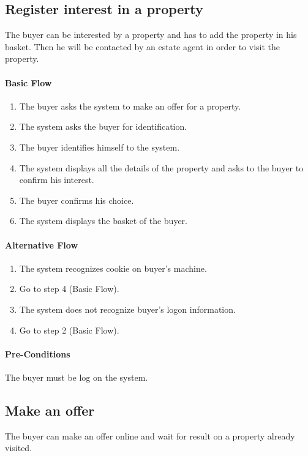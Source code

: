 \documentclass[a4paper,12pt]{article}
\begin{document}
\subsection{Register interest in a property}
The buyer can be interested by a property and has to add the property in his basket. Then he will be contacted by an estate agent in order to visit the property.
\paragraph{Basic Flow}
\begin{enumerate}
\item The buyer asks the system to make an offer for a property.
\item The system asks the buyer for identification.
\item The buyer identifies himself to the system.
\item The system displays all the details of the property and asks to the buyer to confirm his interest.
\item The buyer confirms his choice.
\item The system displays the basket of the buyer.
\end{enumerate}
\paragraph{Alternative Flow}
\begin{enumerate}
\item The system recognizes cookie on buyer's machine. 
\item Go to step 4 (Basic Flow).
\item The system does not recognize buyer's logon information.
\item Go to step 2 (Basic Flow).
\end{enumerate}
\paragraph{Pre-Conditions}
The buyer must be log on the system.

\subsection{Make an offer}
The buyer can make an offer online and wait for result on a property already visited.
\end{document}
